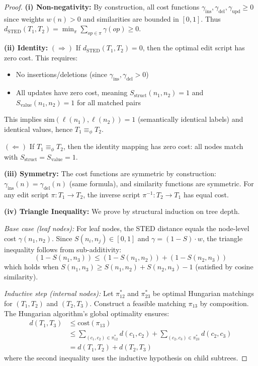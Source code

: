 \documentclass{article}
\begin{document}
\begin{proof}
\textbf{(i) Non-negativity:} By construction, all cost functions $\gamma_{\text{ins}}, \gamma_{\text{del}}, \gamma_{\text{upd}} \geq 0$ since weights $w(n) > 0$ and similarities are bounded in $[0,1]$. Thus $d_{\text{STED}}(T_1, T_2) = \min_\pi \sum_{op \in \pi} \gamma(op) \geq 0$.

\textbf{(ii) Identity:}
$(\Rightarrow)$ If $d_{\text{STED}}(T_1, T_2) = 0$, then the optimal edit script has zero cost. This requires:
\begin{itemize}
    \item No insertions/deletions (since $\gamma_{\text{ins}}, \gamma_{\text{del}} > 0$)
    \item All updates have zero cost, meaning $S_{\text{struct}}(n_1, n_2) = 1$ and $S_{\text{value}}(n_1, n_2) = 1$ for all matched pairs
\end{itemize}
This implies $\text{sim}(\ell(n_1), \ell(n_2)) = 1$ (semantically identical labels) and identical values, hence $T_1 \equiv_\phi T_2$.

$(\Leftarrow)$ If $T_1 \equiv_\phi T_2$, then the identity mapping has zero cost: all nodes match with $S_{\text{struct}} = S_{\text{value}} = 1$.

\textbf{(iii) Symmetry:} The cost functions are symmetric by construction:
$\gamma_{\text{ins}}(n) = \gamma_{\text{del}}(n)$ (same formula), and similarity functions are symmetric. For any edit script $\pi: T_1 \to T_2$, the inverse script $\pi^{-1}: T_2 \to T_1$ has equal cost.

\textbf{(iv) Triangle Inequality:} We prove by structural induction on tree depth.

\emph{Base case (leaf nodes):} For leaf nodes, the STED distance equals the node-level cost $\gamma(n_1, n_2)$. Since $S(n_i, n_j) \in [0,1]$ and $\gamma = (1 - S) \cdot w$, the triangle inequality follows from sub-additivity:
\begin{equation}
    (1 - S(n_1, n_3)) \leq (1 - S(n_1, n_2)) + (1 - S(n_2, n_3))
\end{equation}
which holds when $S(n_1, n_3) \geq S(n_1, n_2) + S(n_2, n_3) - 1$ (satisfied by cosine similarity).

\emph{Inductive step (internal nodes):} Let $\pi_{12}^*$ and $\pi_{23}^*$ be optimal Hungarian matchings for $(T_1, T_2)$ and $(T_2, T_3)$. Construct a feasible matching $\pi_{13}$ by composition. The Hungarian algorithm's global optimality ensures:
\begin{align}
    d(T_1, T_3) &\leq \text{cost}(\pi_{13}) \\
    &\leq \sum_{(c_1, c_2) \in \pi_{12}^*} d(c_1, c_2) + \sum_{(c_2, c_3) \in \pi_{23}^*} d(c_2, c_3) \\
    &= d(T_1, T_2) + d(T_2, T_3)
\end{align}
where the second inequality uses the inductive hypothesis on child subtrees.
\end{proof}
\end{document}
